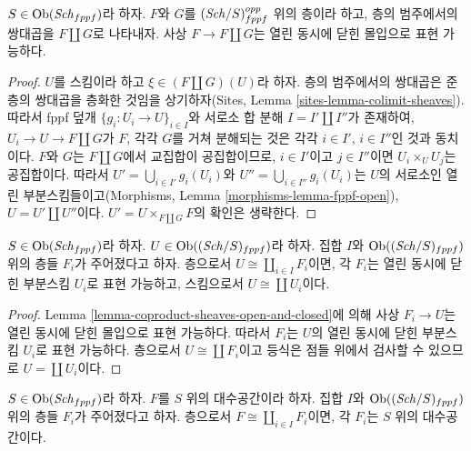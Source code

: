 \begin{lemma}
\label{lemma-coproduct-sheaves-open-and-closed}
$S \in \mathop{\mathrm{Ob}}\nolimits(\mathit{Sch}_{fppf})$라 하자. $F$와 $G$를
$(\mathit{Sch}/S)_{fppf}^{opp}$ 위의 층이라 하고, 층의 범주에서의 쌍대곱을
$F \amalg G$로 나타내자. 사상 $F \to F \amalg G$는 열린 동시에 닫힌
몰입으로 표현 가능하다.
\end{lemma}

\begin{proof}
$U$를 스킴이라 하고 $\xi \in (F \amalg G)(U)$라 하자. 층의 범주에서의
쌍대곱은 준층의 쌍대곱을 층화한 것임을 상기하자(Sites, Lemma
\ref{sites-lemma-colimit-sheaves}). 따라서 fppf 덮개
$\{g_i : U_i \to U\}_{i \in I}$와 서로소 합 분해
$I = I' \amalg I''$가 존재하여, $U_i \to U \to F \amalg G$가
$F$, 각각 $G$를 거쳐 분해되는 것은 각각 $i \in I'$,
$i \in I''$인 것과 동치이다. $F$와 $G$는 $F \amalg G$에서
교집합이 공집합이므로, $i \in I'$이고 $j \in I''$이면
$U_i \times_U U_j$는 공집합이다. 따라서
$U' = \bigcup_{i \in I'} g_i(U_i)$와
$U'' = \bigcup_{i \in I''} g_i(U_i)$는 $U$의 서로소인 열린
부분스킴들이고(Morphisms, Lemma \ref{morphisms-lemma-fppf-open}),
$U = U' \amalg U''$이다.
$U' = U \times_{F \amalg G} F$의 확인은 생략한다.
\end{proof}

\begin{lemma}
\label{lemma-representable-sheaf-coproduct-sheaves}
$S \in \mathop{\mathrm{Ob}}\nolimits(\mathit{Sch}_{fppf})$라 하자.
$U \in \mathop{\mathrm{Ob}}\nolimits((\mathit{Sch}/S)_{fppf})$라 하자.
집합 $I$와 $\mathop{\mathrm{Ob}}\nolimits((\mathit{Sch}/S)_{fppf})$ 위의 층들 $F_i$가 주어졌다고 하자.
층으로서 $U \cong \coprod_{i\in I} F_i$이면, 각 $F_i$는 열린 동시에
닫힌 부분스킴 $U_i$로 표현 가능하고, 스킴으로서
$U \cong \coprod U_i$이다.
\end{lemma}

\begin{proof}
Lemma \ref{lemma-coproduct-sheaves-open-and-closed}에 의해
사상 $F_i \to U$는 열린 동시에 닫힌 몰입으로 표현 가능하다.
따라서 $F_i$는 $U$의 열린 동시에 닫힌 부분스킴 $U_i$로 표현 가능하다.
층으로서 $U \cong \coprod F_i$이고 등식은 점들 위에서 검사할 수 있으므로
$U = \coprod U_i$이다.
\end{proof}

\begin{lemma}
\label{lemma-algebraic-space-coproduct-sheaves}
$S \in \mathop{\mathrm{Ob}}\nolimits(\mathit{Sch}_{fppf})$라 하자.
$F$를 $S$ 위의 대수공간이라 하자.
집합 $I$와 $\mathop{\mathrm{Ob}}\nolimits((\mathit{Sch}/S)_{fppf})$ 위의 층들 $F_i$가 주어졌다고 하자.
층으로서 $F \cong \coprod_{i\in I} F_i$이면, 각 $F_i$는 $S$ 위의
대수공간이다.
\end{lemma}

